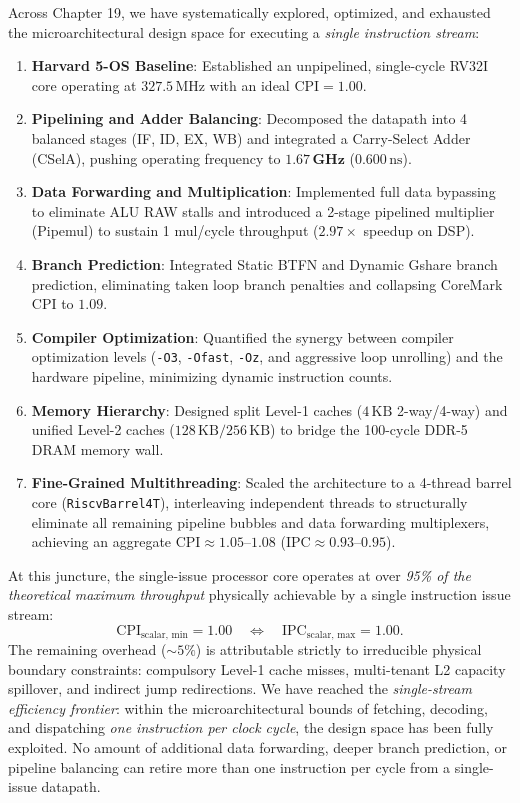 Across Chapter 19, we have systematically explored, optimized, and exhausted the microarchitectural design space for executing a \textit{single instruction stream}:
\begin{enumerate}
    \item \textbf{Harvard 5-OS Baseline}: Established an unpipelined, single-cycle RV32I core operating at $327.5\,\text{MHz}$ with an ideal $\text{CPI} = 1.00$.
    \item \textbf{Pipelining and Adder Balancing}: Decomposed the datapath into 4 balanced stages (IF, ID, EX, WB) and integrated a Carry-Select Adder (CSelA), pushing operating frequency to $\mathbf{1.67\,\text{GHz}}$ ($0.600\,\text{ns}$).
    \item \textbf{Data Forwarding and Multiplication}: Implemented full data bypassing to eliminate ALU RAW stalls and introduced a 2-stage pipelined multiplier (Pipemul) to sustain 1 mul/cycle throughput ($2.97\times$ speedup on DSP).
    \item \textbf{Branch Prediction}: Integrated Static BTFN and Dynamic Gshare branch prediction, eliminating taken loop branch penalties and collapsing CoreMark CPI to $1.09$.
    \item \textbf{Compiler Optimization}: Quantified the synergy between compiler optimization levels (\texttt{-O3}, \texttt{-Ofast}, \texttt{-Oz}, and aggressive loop unrolling) and the hardware pipeline, minimizing dynamic instruction counts.
    \item \textbf{Memory Hierarchy}: Designed split Level-1 caches ($4\,\text{KB}$ 2-way/4-way) and unified Level-2 caches ($128\,\text{KB}/256\,\text{KB}$) to bridge the 100-cycle DDR-5 DRAM memory wall.
    \item \textbf{Fine-Grained Multithreading}: Scaled the architecture to a 4-thread barrel core (\texttt{RiscvBarrel4T}), interleaving independent threads to structurally eliminate all remaining pipeline bubbles and data forwarding multiplexers, achieving an aggregate $\text{CPI} \approx 1.05\text{--}1.08$ ($\text{IPC} \approx 0.93\text{--}0.95$).
\end{enumerate}

At this juncture, the single-issue processor core operates at over \textit{95\% of the theoretical maximum throughput} physically achievable by a single instruction issue stream:
\begin{equation}
\text{CPI}_{\text{scalar, min}} = 1.00 \quad \iff \quad \text{IPC}_{\text{scalar, max}} = 1.00.
\end{equation}
The remaining overhead ($\sim 5\%$) is attributable strictly to irreducible physical boundary constraints: compulsory Level-1 cache misses, multi-tenant L2 capacity spillover, and indirect jump redirections. We have reached the \textit{single-stream efficiency frontier}: within the microarchitectural bounds of fetching, decoding, and dispatching \emph{one instruction per clock cycle}, the design space has been fully exploited. No amount of additional data forwarding, deeper branch prediction, or pipeline balancing can retire more than one instruction per cycle from a single-issue datapath.

